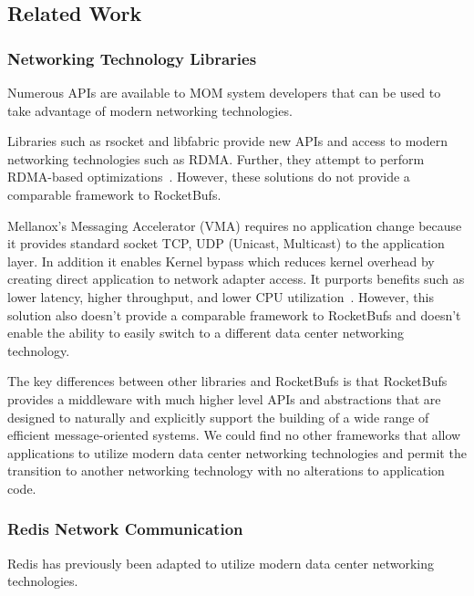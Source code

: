 \documentclass[letterpaper,twocolumn,10pt]{article}
\begin{document}


\subsection{Related Work}

\subsubsection{Networking Technology Libraries}
Numerous APIs are available to MOM system developers that can be used to take advantage of modern networking technologies.

Libraries such as rsocket and libfabric provide new APIs and access to modern networking technologies such as RDMA. Further, they attempt to perform RDMA-based optimizations~\cite{Rocketbufs}.
However, these solutions do not provide a comparable framework to RocketBufs.

Mellanox's Messaging Accelerator (VMA) requires no application change because it provides standard socket TCP, UDP (Unicast, Multicast) to the application layer. In addition it enables Kernel bypass which reduces kernel overhead by creating direct application to network adapter access. It purports benefits such as lower latency, higher throughput, and lower CPU utilization~\cite{mellanox9}. However, this solution also doesn't provide a comparable framework to RocketBufs and doesn't enable the ability to easily switch to a different data center networking technology.

The key differences between other libraries and RocketBufs is that RocketBufs provides a middleware with much higher level APIs and abstractions that are designed to naturally and explicitly support the building of a wide range of efficient message-oriented systems. We could find no other frameworks that allow applications to utilize modern data center networking technologies and permit the transition to another networking technology with no alterations to application code.


\subsubsection{Redis Network Communication}
Redis has previously been adapted to utilize modern data center networking technologies.
\end{document}
